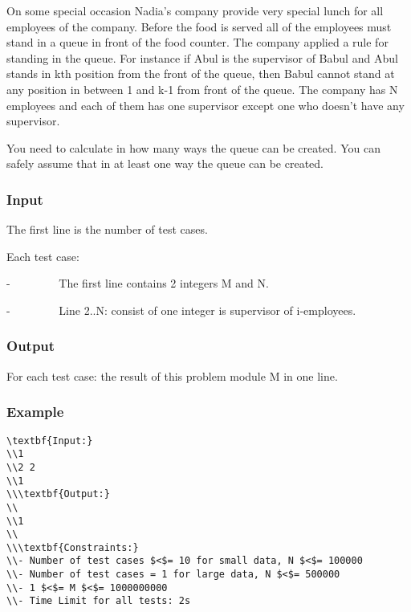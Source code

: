 



   On some special occasion Nadia’s company provide very special lunch for all employees of the company. Before the food is served all of the employees must stand in a queue in front of the food counter. The company applied a rule for standing in the queue. For instance if Abul is the supervisor of Babul and Abul stands in kth position from the front of the queue, then Babul cannot stand at any position in between 1 and k-1 from front of the queue. The company has N employees and each of them has one supervisor except one who doesn’t have any supervisor.  

   You need to calculate in how many ways the queue can be created. You can safely assume that in at least one way the queue can be created.  

\subsubsection{   Input  }

   The first line is the number of test cases.  

   Each test case:  

   -         The first line contains 2 integers M and N.  

   -         Line 2..N: consist of one integer is supervisor of i-employees.  

\subsubsection{   Output  }

   For each test case: the result of this problem module M in one line.  

\subsubsection{   Example  }
\begin{verbatim}
\textbf{Input:}
\\1
\\2 2
\\1
\\\textbf{Output:}
\\
\\1
\\
\\\textbf{Constraints:}
\\- Number of test cases $<$= 10 for small data, N $<$= 100000
\\- Number of test cases = 1 for large data, N $<$= 500000
\\- 1 $<$= M $<$= 1000000000
\\- Time Limit for all tests: 2s\end{verbatim}